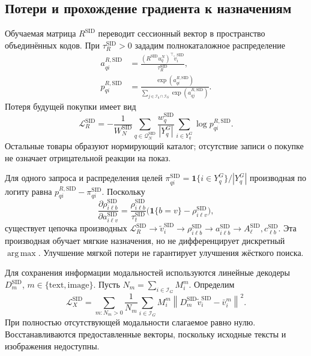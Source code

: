 \documentclass[12pt,a4paper]{article}
\newcommand{\ind}{\mathbf 1}
\newcommand{\norm}[1]{\left\lVert#1\right\rVert}
\DeclareMathOperator*{\argmax}{arg\,max}
\theoremstyle{plainru}
\begin{document}
\subsection{Потери и прохождение градиента к назначениям}
\label{sec:sid-loss}

Обучаемая матрица $R^{\mathrm{SID}}$ переводит сессионный вектор
в пространство объединённых кодов. При $\tau_R^{\mathrm{SID}}>0$
зададим полнокаталожное распределение
\begin{align}\label{eq:sid-full-prob}
 a_{qi}^{R,\mathrm{SID}}
 &=\frac{(R^{\mathrm{SID}}u_q^N)^\top
                  \widetilde v_i^{\mathrm{SID}}}
                {\tau_R^{\mathrm{SID}}},\\
 p_{qi}^{R,\mathrm{SID}}
 &=\frac{\exp(a_{qi}^{R,\mathrm{SID}})}
 {\sum_{j\in\mathcal I_q\cap\mathcal I_G}
             \exp(a_{qj}^{R,\mathrm{SID}})}.
\end{align}
Потеря будущей покупки имеет вид
\begin{equation}\label{eq:sid-rec-loss}
 \mathcal L_R^{\mathrm{SID}}
 =-\frac{1}{W_N^{\mathrm{SID}}}
 \sum_{q\in\mathcal Q_N^{\mathrm{SID}}}
 \frac{w_q^{\mathrm{SID}}}{|Y_q^G|}
       \sum_{i\in Y_q^G}\log p_{qi}^{R,\mathrm{SID}}.
\end{equation}
Остальные товары образуют нормирующий каталог;
отсутствие записи о покупке не означает отрицательной реакции на показ.

Для одного запроса и распределения целей
$\pi_{qi}^{\mathrm{SID}}=\ind\{i\in Y_q^G\}/|Y_q^G|$
производная по логиту равна
$p_{qi}^{R,\mathrm{SID}}-\pi_{qi}^{\mathrm{SID}}$.
Поскольку
\begin{equation}\label{eq:sid-soft-gradient}
 \frac{\partial\rho_{i\ell b}^{\mathrm{SID}}}
      {\partial a_{i\ell v}^{\mathrm{SID}}}
 =\frac{\rho_{i\ell b}^{\mathrm{SID}}}
            {\tau_t^{\mathrm{SID}}}
       \bigl(\ind\{b=v\}-\rho_{i\ell v}^{\mathrm{SID}}\bigr),
\end{equation}
существует цепочка производных
$\mathcal L_R^{\mathrm{SID}}\to\widetilde v_i^{\mathrm{SID}}
\to\rho_{i\ell b}^{\mathrm{SID}}\to a_{i\ell b}^{\mathrm{SID}}
\to A_\ell^{\mathrm{SID}},c_{\ell b}^{\mathrm{SID}}$.
Эта производная обучает мягкие назначения, но не дифференцирует
дискретный $\argmax$. Улучшение мягкой потери не гарантирует
улучшения жёсткого поиска.

Для сохранения информации модальностей используются линейные
декодеры $D_m^{\mathrm{SID}}$, $m\in\{\mathrm{text},\mathrm{image}\}$.
Пусть $N_m=\sum_{i\in\mathcal I_G}M_i^m$. Определим
\begin{equation}\label{eq:sid-reconstruction}
 \mathcal L_X^{\mathrm{SID}}
 =\sum_{m:N_m>0}\frac{1}{N_m}
 \sum_{i\in\mathcal I_G}M_i^m
 \norm{D_m^{\mathrm{SID}}\widetilde v_i^{\mathrm{SID}}
                        -\bar v_i^m}^{2}.
\end{equation}
При полностью отсутствующей модальности слагаемое равно нулю.
Восстанавливаются предоставленные векторы, поскольку исходные тексты
и изображения недоступны.
\end{document}
